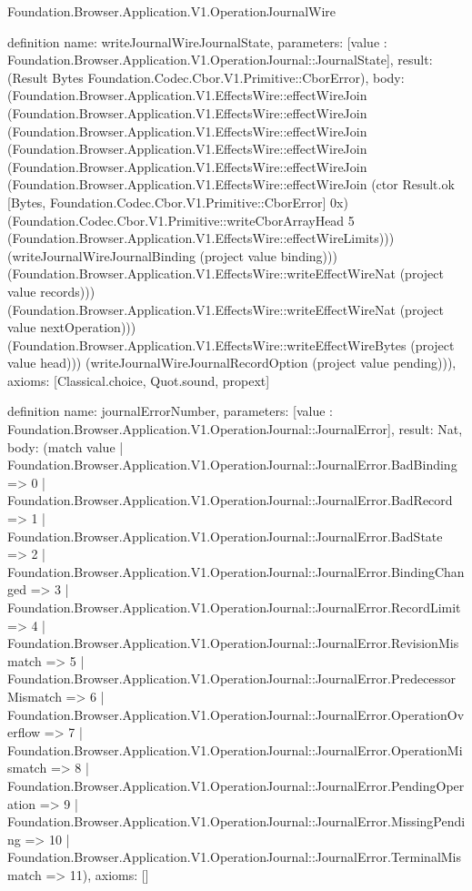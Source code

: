 \begin{lexlean}{Foundation.Browser.Application.V1.OperationJournalWire}
\begin{semanticmodule}
definition{
  name: writeJournalWireJournalState,
  parameters: [value : Foundation.Browser.Application.V1.OperationJournal::JournalState],
  result: (Result Bytes Foundation.Codec.Cbor.V1.Primitive::CborError),
  body: (Foundation.Browser.Application.V1.EffectsWire::effectWireJoin (Foundation.Browser.Application.V1.EffectsWire::effectWireJoin (Foundation.Browser.Application.V1.EffectsWire::effectWireJoin (Foundation.Browser.Application.V1.EffectsWire::effectWireJoin (Foundation.Browser.Application.V1.EffectsWire::effectWireJoin (Foundation.Browser.Application.V1.EffectsWire::effectWireJoin (ctor Result.ok [Bytes, Foundation.Codec.Cbor.V1.Primitive::CborError] 0x) (Foundation.Codec.Cbor.V1.Primitive::writeCborArrayHead 5 (Foundation.Browser.Application.V1.EffectsWire::effectWireLimits))) (writeJournalWireJournalBinding (project value binding))) (Foundation.Browser.Application.V1.EffectsWire::writeEffectWireNat (project value records))) (Foundation.Browser.Application.V1.EffectsWire::writeEffectWireNat (project value nextOperation))) (Foundation.Browser.Application.V1.EffectsWire::writeEffectWireBytes (project value head))) (writeJournalWireJournalRecordOption (project value pending))),
  axioms: [Classical.choice, Quot.sound, propext]
}

definition{
  name: journalErrorNumber,
  parameters: [value : Foundation.Browser.Application.V1.OperationJournal::JournalError],
  result: Nat,
  body: (match value
    | Foundation.Browser.Application.V1.OperationJournal::JournalError.BadBinding => 0
    | Foundation.Browser.Application.V1.OperationJournal::JournalError.BadRecord => 1
    | Foundation.Browser.Application.V1.OperationJournal::JournalError.BadState => 2
    | Foundation.Browser.Application.V1.OperationJournal::JournalError.BindingChanged => 3
    | Foundation.Browser.Application.V1.OperationJournal::JournalError.RecordLimit => 4
    | Foundation.Browser.Application.V1.OperationJournal::JournalError.RevisionMismatch => 5
    | Foundation.Browser.Application.V1.OperationJournal::JournalError.PredecessorMismatch => 6
    | Foundation.Browser.Application.V1.OperationJournal::JournalError.OperationOverflow => 7
    | Foundation.Browser.Application.V1.OperationJournal::JournalError.OperationMismatch => 8
    | Foundation.Browser.Application.V1.OperationJournal::JournalError.PendingOperation => 9
    | Foundation.Browser.Application.V1.OperationJournal::JournalError.MissingPending => 10
    | Foundation.Browser.Application.V1.OperationJournal::JournalError.TerminalMismatch => 11),
  axioms: []
}


\end{semanticmodule}
\end{lexlean}

